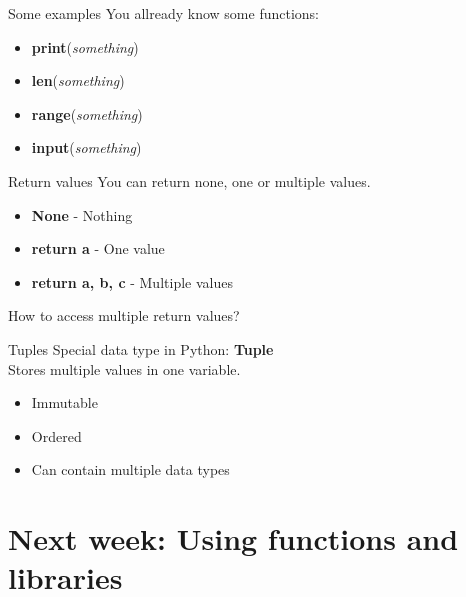 \documentclass{beamer}
\begin{document}
\begin{frame}{Some examples}
    You allready know some functions:
    \begin{itemize}
        \item<1-> \textbf{print}(\textit{something})
        \item<2-> \textbf{len}(\textit{something})
        \item<3-> \textbf{range}(\textit{something})
        \item<4-> \textbf{input}(\textit{something})
    \end{itemize}
    
\end{frame}

\begin{frame}{Return values}
    You can return none, one or multiple values.\pause
    \begin{itemize}
        \item<2-> \textbf{None} - Nothing
        \item<3-> \textbf{return a} - One value
        \item<4-> \textbf{return a, b, c} - Multiple values
    \end{itemize}\pause
    How to access multiple return values?

\end{frame}

\begin{frame}{Tuples}
    Special data type in Python: \textbf{Tuple}\\ \pause
    Stores multiple values in one variable.\\ \pause
    \begin{itemize}
        \item Immutable
        \item Ordered
        \item Can contain multiple data types
    \end{itemize}
\end{frame}
\section{Next week: Using functions and libraries}
\end{document}
